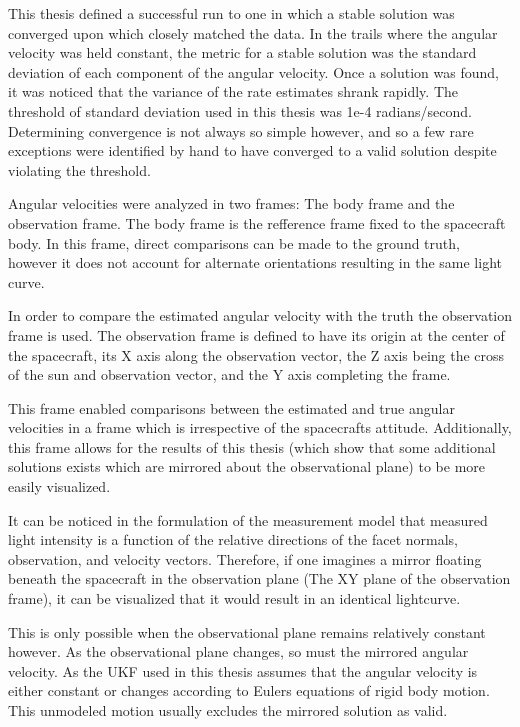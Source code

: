 This thesis defined a successful run to one in which a stable solution was converged upon which closely matched the data.  In the trails where the angular velocity was held constant, the metric for a stable solution was the standard deviation of each component of the angular velocity. Once a solution was found, it was noticed that the variance of the rate estimates shrank rapidly. The threshold of standard deviation used in this thesis was 1e-4 radians/second. Determining convergence is not always so simple however, and so a few rare exceptions were identified by hand to have converged to a valid solution despite violating the threshold.

Angular velocities were analyzed in two frames: The body frame and the observation frame. The body frame is the refference frame fixed to the spacecraft body. In this frame, direct comparisons can be made to the ground truth, however it does not account for alternate orientations resulting in the same light curve. 

In order to compare the estimated angular velocity with the truth the observation frame is used. The observation frame is defined to have its origin at the center of the spacecraft, its X axis along the observation vector, the Z axis being the cross of the sun and observation vector, and the Y axis completing the frame. 

This frame enabled comparisons between the estimated and true angular velocities in a frame which is irrespective of the spacecrafts attitude. Additionally, this frame allows for the results of this thesis (which show that some additional solutions exists which are mirrored about the observational plane) to be more easily visualized.

It can be noticed in the formulation of the measurement model that measured light intensity is a function of the relative directions of the facet normals, observation, and velocity vectors. Therefore, if one imagines a mirror floating beneath the spacecraft in the observation plane (The XY plane of the observation frame), it can be visualized that it would result in an identical lightcurve.

This is only possible when the observational plane remains relatively constant however. As the observational plane changes, so must the mirrored angular velocity. As the UKF used in this thesis assumes that the angular velocity is either constant or changes according to Eulers equations of rigid body motion. This unmodeled motion usually excludes the mirrored solution as valid.

